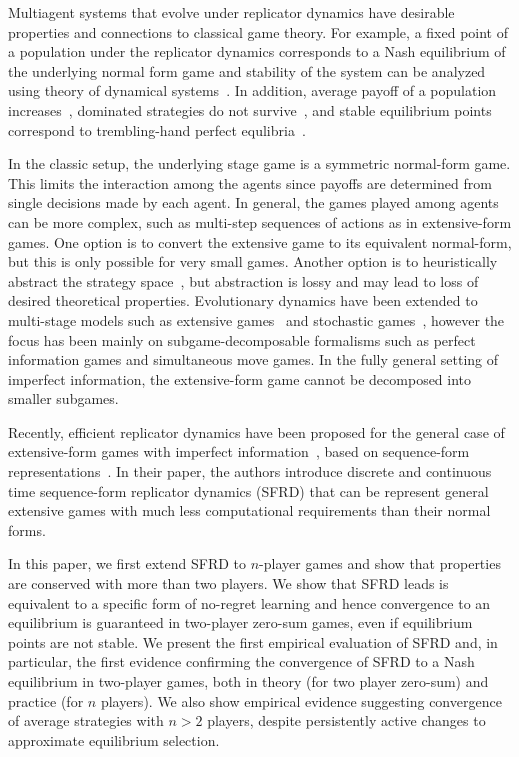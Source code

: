 \documentclass{aamas2014}
\begin{document}
Multiagent systems that evolve under replicator dynamics have desirable properties and connections to classical game theory. 
For example, a fixed point of a population under the replicator dynamics corresponds to a Nash equilibrium of the underlying normal 
form game and stability of the system can be analyzed using theory of dynamical systems~\cite{FudLev98,Gintis09}. 
In addition, average payoff of a population increases~\cite{HS98}, dominated strategies do not survive~\cite{Gintis09}, and 
stable equilibrium points correspond to trembling-hand perfect equlibria~\cite{FudLev98,ShoLB08}.

In the classic setup, the underlying stage game is a symmetric normal-form game. This limits the interaction
among the agents since payoffs are determined from single decisions made by each agent. In general, the games played among agents 
can be more complex, such as multi-step sequences of actions as in extensive-form games. 
One option is to convert the extensive game to its equivalent normal-form, but this is only possible for very small games. 
Another option is to heuristically abstract the strategy space~\cite{ponsen09b}, but 
abstraction is lossy and may lead to loss of desired theoretical properties.
Evolutionary dynamics have been extended to 
multi-stage models such as extensive games~\cite{Cressman03} and stochastic games~\cite{Flesch13Evolutionary,Hennes09State}, 
however the focus has been mainly on subgame-decomposable formalisms such as perfect information games and
simultaneous move games. In the fully general setting of imperfect information, the extensive-form game cannot be 
decomposed into smaller subgames. 

Recently, efficient replicator dynamics have been proposed for the general case of extensive-form games with 
imperfect information~\cite{Gatti13Efficient}, based on sequence-form representations~\cite{SequenceFormLPs}. 
In their paper, the authors introduce discrete and continuous time sequence-form replicator dynamics (SFRD)
that can be represent general extensive games with much less computational requirements than their 
normal forms. 

In this paper, we first extend SFRD to $n$-player games and 
show that properties are conserved with more than two players. 
We show that SFRD leads is equivalent to a specific form of no-regret learning and hence convergence to an 
equilibrium is guaranteed in two-player zero-sum games, even if equilibrium points are not stable. 
We present the first empirical evaluation of SFRD and, in particular, the first evidence confirming the convergence 
of SFRD to a Nash equilibrium in two-player games, both in theory (for two player zero-sum) and practice (for $n$ players).
We also show empirical evidence suggesting convergence of average strategies with $n > 2$ players, despite persistently 
active changes to approximate equilibrium selection. 
\end{document}
